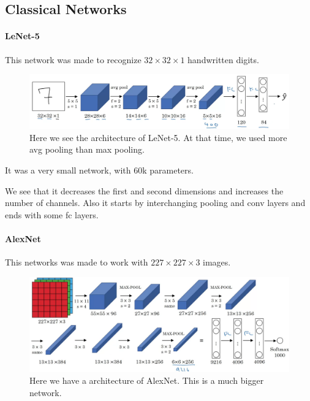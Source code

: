 \documentclass[12pt, a4paper, oneside]{book}
\begin{document}
\subsection{Classical Networks}%
\label{sub:classical_networks}

\paragraph{LeNet-5}%
\label{par:lenet_5}

This network was made to recognize $32\times 32\times 1$ handwritten digits.

\begin{figure}[h]
\centering
\includegraphics[scale=0.3]{Res/LetNet5.png}
\caption{Here we see the architecture of LeNet-5. At that time, we used more avg
pooling than max pooling.}
\label{LetNet5.png}
\end{figure}

It was a very small network, with $60$k parameters.

We see that it decreases the first and second dimensions and increases the
number of channels. Also it starts by interchanging pooling and conv layers and
ends with some fc layers.

\paragraph{AlexNet}%
\label{par:alexnet}

This networks was made to work with $227\times 227\times 3$ images.

\begin{figure}[h]
\centering
\includegraphics[scale=0.3]{Res/AlexNet.png}
\caption{Here we have a architecture of AlexNet. This is a much bigger network.}
\label{AlexNet.png}
\end{figure}
\end{document}
